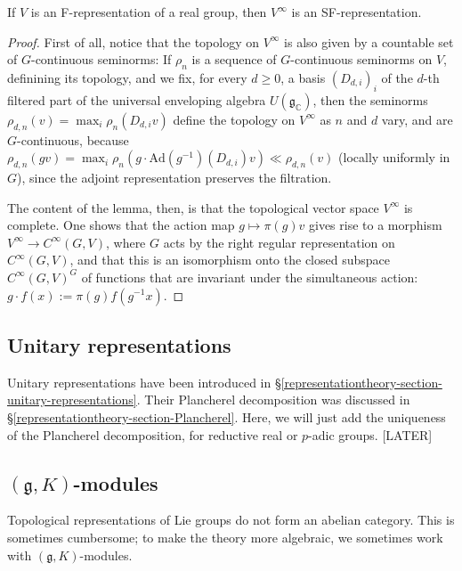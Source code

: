 \begin{lemma}
 \label{lemma-smooth-vectors-Frepresentation}
If $V$ is an F-representation of a real group, then $V^\infty$ is an SF-representation.
\end{lemma}

\begin{proof}
First of all, notice that the topology on $V^\infty$ is also given by a countable set of $G$-continuous seminorms: If $\rho_n$ is a sequence of $G$-continuous seminorms on $V$, definining its topology, and we fix, for every $d\ge 0$, a basis $(D_{d,i})_i$ of the $d$-th filtered part of the universal enveloping algebra $U(\mathfrak g_{\mathbb C})$, then the seminorms $\rho_{d,n}(v) = \max_i \rho_n (D_{d,i}v)$ define the topology on $V^\infty$ as $n$ and $d$ vary, and are $G$-continuous, because $\rho_{d,n}(gv) = \max_i \rho_n (g \cdot \text{Ad}(g^{-1})(D_{d,i}) v) \ll \rho_{d,n}(v)$ (locally uniformly in $G$), since the adjoint representation preserves the filtration. 


The content of the lemma, then, is that the topological vector space $V^\infty$ is complete. One shows that the action map $g\mapsto \pi(g) v$ gives rise to a morphism $V^\infty \to C^\infty(G, V)$, where $G$ acts by the right regular representation on $C^\infty(G, V)$, and that this is an isomorphism onto the closed subspace $C^\infty(G, V)^G$ of functions that are invariant under the simultaneous action: $g\cdot f (x) := \pi(g) f(g^{-1} x)$. 
\end{proof}

\subsection{Unitary representations}
\label{subsection-unitary-representations}

Unitary representations have been introduced in \S \ref{representationtheory-section-unitary-representations}. Their Plancherel decomposition was discussed in \S \ref{representationtheory-section-Plancherel}. Here, we will just add the uniqueness of the Plancherel decomposition, for reductive real or $p$-adic groups. [LATER]


\subsection{$(\mathfrak g, K)$-modules}
\label{subsection-gK-modules}

Topological representations of Lie groups do not form an abelian category. This is sometimes cumbersome; to make the theory more algebraic, we sometimes work with $(\mathfrak g,K)$-modules. 

